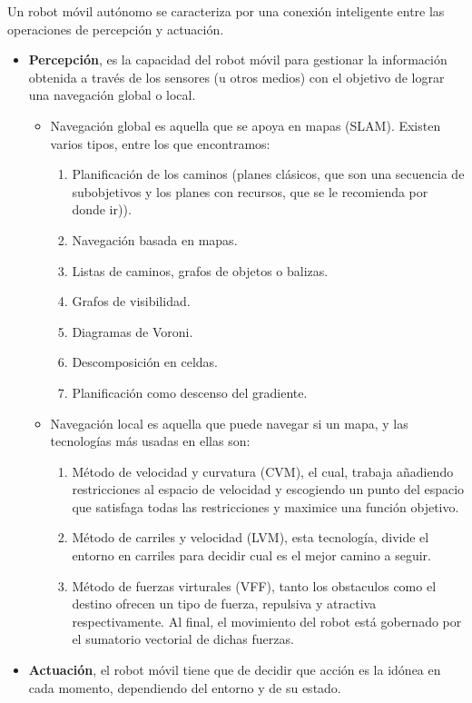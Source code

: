 \begin{itemize}
Un robot móvil autónomo se caracteriza por una conexión inteligente entre las operaciones de percepción y actuación.
\begin{itemize}
  \item \textbf{Percepción}, es la capacidad del robot móvil para gestionar la información obtenida a través de los sensores (u otros medios) con el objetivo de lograr una navegación global o local.
   \begin{itemize}
    \item Navegación global es aquella que se apoya en mapas (SLAM). Existen varios tipos, entre los que encontramos:
      \begin{enumerate}
	\item Planificación de los caminos (planes clásicos, que son una secuencia de subobjetivos y los planes con recursos, que se le recomienda por donde ir)).
	\item Navegación basada en mapas.
	\item Listas de caminos, grafos de objetos o balizas.
	\item Grafos de visibilidad.
	\item Diagramas de Voroni.
	\item Descomposición en celdas.
	\item Planificación como descenso del gradiente.
      \end{enumerate}
    \item Navegación local es aquella que puede navegar si un mapa, y las tecnologías más usadas en ellas son:
      \begin{enumerate}
	\item Método de velocidad y curvatura (CVM), el cual, trabaja añadiendo restricciones al espacio de velocidad y escogiendo un punto del espacio que satisfaga todas las restricciones y maximice una función objetivo.
	\item Método de carriles y velocidad (LVM), esta tecnología, divide el entorno en carriles para decidir cual es el mejor camino a seguir.
	\item Método de fuerzas virturales (VFF), tanto los obstaculos como el destino ofrecen un tipo de fuerza, repulsiva y atractiva respectivamente. Al final, el movimiento del robot está gobernado por el sumatorio vectorial de dichas fuerzas.
      \end{enumerate}
   \end{itemize}
  \item \textbf{Actuación}, el robot móvil tiene que de decidir que acción es la idónea en cada momento, dependiendo del entorno y de su estado.
\end{itemize}
\end{itemize}


